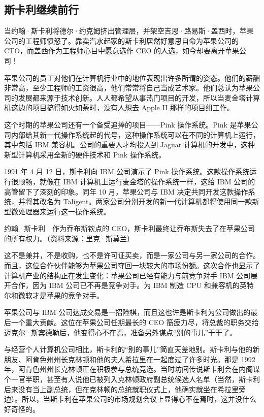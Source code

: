 \documentclass[12pt,UTF8]{ctexbook}
\begin{document}
\subsection{斯卡利继续前行}


当约翰·斯卡利将德尔·约克姆挤出管理层，并架空吉恩·路易斯·盖西时，苹果公司的工程师愤怒了。靠卖汽水起家的斯卡利居然好意思自命为苹果公司的 CTO，而盖西作为工程师心目中愿意选作 CEO 的人选，如今却要离开苹果公司！

苹果公司的员工对他们在计算机行业中的地位表现出许多所谓的姿态。他们的薪酬非常高，至少工程师的工资很高，他们常常将自己当成艺术家。他们总认为苹果公司的发展都来源于技术创新。人人都希望从事热门项目的开发，所以当麦金塔计算机这边的项目搞得如火如荼时，没有人想去 Apple II 那样的项目组工作。

这个时期的苹果公司还有一个备受追捧的项目——Pink 操作系统。Pink 是苹果公司内部给其新一代操作系统起的代号，这种操作系统可以在不同的计算机上运行，其中包括 IBM 兼容机。公司的重要人才均投入到 Jaguar 计算机的开发中，这种新型计算机采用全新的硬件技术和 Pink 操作系统。

1991 年 4 月 12 日，斯卡利向 IBM 公司演示了 Pink 操作系统。这款操作系统运行很顺畅，就像在 IBM 计算机上运行麦金塔的操作系统一样，这给 IBM 公司的高管留下了深刻的印象。同年 10 月，苹果公司与 IBM 决定共同开发这款操作系统，并将其改名为 Taligent。两家公司分别开发的新一代计算机都将使用同一款新型微处理器来运行这一操作系统。



约翰·斯卡利　作为乔布斯钦点的 CEO，斯卡利最终让乔布斯失去了在苹果公司的所有权力。（资料来源：里克·斯莫兰）

这不是兼并，不是收购，也不是许可证买卖，而是一家公司与另一家公司的合作。而且，这位合作伙伴能够为苹果公司夺回一块较大的市场份额。这次合作也显示了计算机产业的结构正在发生变化：苹果公司已经有能力与前竞争对手 IBM 公司展开合作，因为 IBM 公司已不再是竞争对手。为 IBM 制造 CPU 和兼容机的英特尔和微软才是苹果的竞争对手。

苹果公司与 IBM 公司达成交易是一招险棋，而且这也许是斯卡利为公司做出的最后一个重大贡献。这位在苹果公司任期最长的 CEO 筋疲力尽，将总裁的职务交给迈克尔·斯宾德勒后，他变得心不在焉，准备另外谋点“别的事儿”干干了。

与经营个人计算机公司相比，斯卡利的“别的事儿”简直天差地别。斯卡利与他的新朋友、阿肯色州州长克林顿和他的夫人希拉里在一起度过了许多时光。那是 1992 年，阿肯色州州长克林顿正在积极参与总统竞选。当时坊间传说斯卡利会在内阁谋个一官半职，甚至有人说他已被列入克林顿政府副总统候选人名单（当然，斯卡利后来没有当上副总统，但在克林顿的总统就职仪式上，他确实就坐在希拉里旁边）。所以，当斯卡利在苹果公司的市场规划会议上显得心不在焉时，这并没什么好奇怪的。
\end{document}
